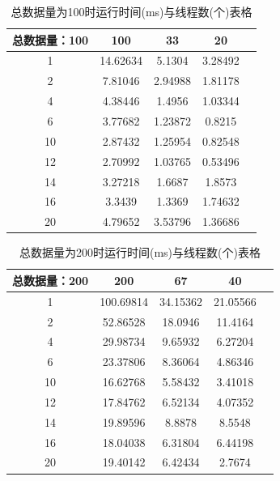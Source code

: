 \documentclass[UTF8]{ctexart}
\begin{document}
\begin{table}[H]
    \centering
    \begin{tabular}{|c|c|c|c|c|}
        \hline
        总数据量：100& 	100&	33& 	20\\
        \hline
        1&	14.62634&	5.1304&	3.28492\\
        \hline
        2&	7.81046&	2.94988&	1.81178\\
        \hline
        4&	4.38446&	1.4956&	1.03344\\
        \hline
        6&	3.77682&	1.23872&	0.8215\\
        \hline
        10&	2.87432&	1.25954&	0.82548\\
        \hline
        12&	2.70992&	1.03765&	0.53496\\
        \hline
        14&	3.27218&	1.6687&	1.8573\\
        \hline
        16&	3.3439&	    1.3369&	1.74632\\
        \hline
        20&	4.79652&	3.53796&	1.36686\\
        \hline
    \end{tabular}
    \caption{总数据量为100时运行时间(ms)与线程数(个)表格}
\end{table}
\begin{table}[H]
    \centering
    \begin{tabular}{|c|c|c|c|c|}
        \hline
        总数据量：200& 	200& 	67& 	40\\
        \hline
        1&	100.69814&	34.15362&	21.05566\\
        \hline
        2&	52.86528&	18.0946&	11.4164\\
        \hline
        4&	29.98734&	9.65932&	6.27204\\
        \hline
        6&	23.37806&	8.36064&	4.86346\\
        \hline
        10&	16.62768&	5.58432&    3.41018\\
        \hline
        12&	17.84762&	6.52134&	4.07352\\
        \hline
        14&	19.89596&	8.8878&	8.5548\\
        \hline
        16&	18.04038&	6.31804&	6.44198\\
        \hline
        20&	19.40142&	6.42434&	2.7674\\
        \hline
    \end{tabular}
    \caption{总数据量为200时运行时间(ms)与线程数(个)表格}
\end{table}
\end{document}
